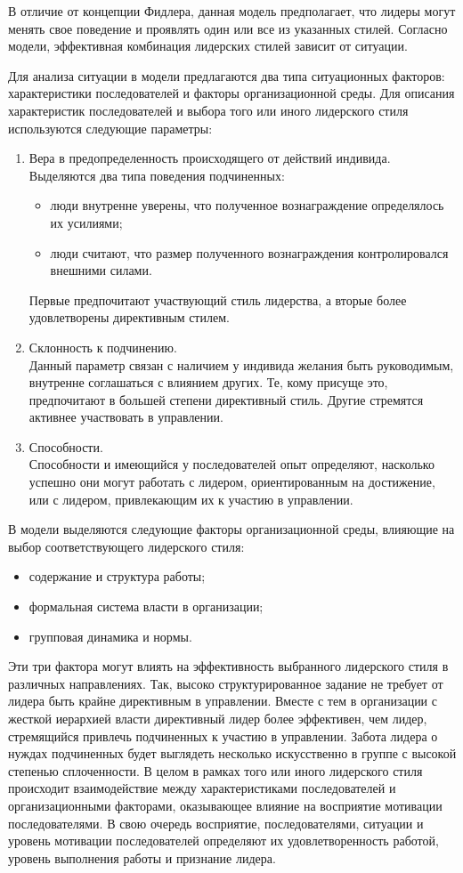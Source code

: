 \documentclass[a4paper,12pt,oneside,final]{extarticle}
\numberwithin{equation}{section}
\begin{document}
В отличие от концепции Фидлера, данная модель предполагает, что лидеры могут менять свое поведение и проявлять один или все из указанных стилей. 
Согласно модели, эффективная комбинация лидерских стилей зависит от ситуации.

Для анализа ситуации в модели предлагаются два типа ситуационных факторов: характеристики последователей и факторы организационной среды. 
Для описания характеристик последователей и выбора того или иного лидерского стиля используются следующие параметры:
\begin{enumerate}
	\item Вера в предопределенность происходящего от действий индивида. \\
	Выделяются два типа поведения подчиненных:
	\begin{itemize}
		\item люди внутренне уверены, что полученное вознаграждение определялось их усилиями;
		\item люди считают, что размер полученного вознаграждения контролировался внешними силами.
	\end{itemize}
	Первые предпочитают участвующий стиль лидерства, а вторые более удовлетворены директивным стилем.
	\item Склонность к подчинению. \\
	Данный параметр связан с наличием у индивида желания быть руководимым, внутренне соглашаться с влиянием других. 
	Те, кому присуще это, предпочитают в большей степени директивный стиль. 
	Другие стремятся активнее участвовать в управлении.
	\item Способности. \\ 
	Способности и имеющийся у последователей опыт определяют, насколько успешно они могут работать с лидером, ориентированным на достижение, или с лидером, привлекающим их к участию в управлении.
\end{enumerate}

В модели выделяются следующие факторы организационной среды, влияющие на выбор соответствующего лидерского стиля:
\begin{itemize}
	\item содержание и структура работы;
	\item формальная система власти в организации;
	\item групповая динамика и нормы.
\end{itemize}

Эти три фактора могут влиять на эффективность выбранного лидерского стиля в различных направлениях. 
Так, высоко структурированное задание не требует от лидера быть крайне директивным в управлении. 
Вместе с тем в организации с жесткой иерархией власти директивный лидер более эффективен, чем лидер, стремящийся привлечь подчиненных к участию в управлении. 
Забота лидера о нуждах подчиненных будет выглядеть несколько искусственно в группе с высокой степенью сплоченности. 
В целом в рамках того или иного лидерского стиля происходит взаимодействие между характеристиками последователей и организационными факторами, оказывающее влияние на восприятие мотивации последователями. 
В свою очередь восприятие, последователями, ситуации и уровень мотивации последователей определяют их удовлетворенность работой, уровень выполнения работы и признание лидера.
\end{document}
